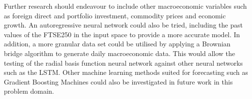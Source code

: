 \documentclass[11pt,a4paper]{article}
\begin{document}
Further research should endeavour to include other macroeconomic variables such as 
foreign direct and portfolio investment, commodity prices and economic growth.
An autoregressive neural network could also be tried, including the past values of the 
FTSE250 in the input space to provide a more accurate model. In addition, 
a more granular data set could be utilised by applying a 
Brownian bridge algorithm to generate daily macroeconomic data. This would allow 
the testing of the radial basis function neural network against other neural networks 
such as the LSTM. Other machine learning methods suited for 
forecasting such as Gradient Boosting Machines could 
also be investigated in future work in this problem domain. 



\end{document}
